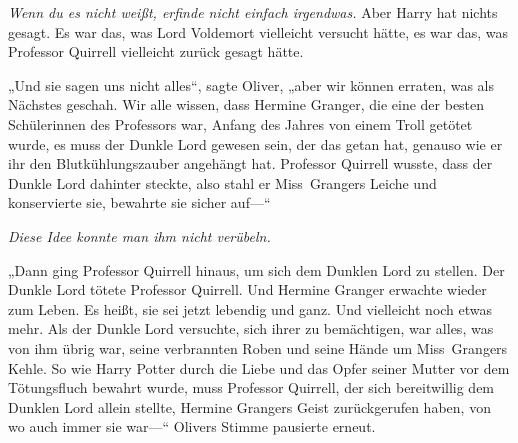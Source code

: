 \emph{Wenn du es nicht weißt, erfinde nicht einfach irgendwas.}
Aber Harry hat nichts gesagt. Es war das, was Lord Voldemort vielleicht versucht hätte, es war das, was Professor Quirrell vielleicht zurück gesagt hätte.

„Und sie sagen uns nicht alles“, sagte Oliver, „aber wir können erraten, was als Nächstes geschah. Wir alle wissen, dass Hermine Granger, die eine der besten Schülerinnen des Professors war, Anfang des Jahres von einem Troll getötet wurde, es muss der Dunkle Lord gewesen sein, der das getan hat, genauso wie er ihr den Blutkühlungszauber angehängt hat. Professor Quirrell wusste, dass der Dunkle Lord dahinter steckte, also stahl er Miss~Grangers Leiche und konservierte sie, bewahrte sie sicher auf—“

\emph{Diese Idee konnte man ihm nicht verübeln.}

„Dann ging Professor Quirrell hinaus, um sich dem Dunklen Lord zu stellen. Der Dunkle Lord tötete Professor Quirrell. Und Hermine Granger erwachte wieder zum Leben. Es heißt, sie sei jetzt lebendig und ganz. Und vielleicht noch etwas mehr.
Als der Dunkle Lord versuchte, sich ihrer zu bemächtigen, war alles, was von ihm übrig war, seine verbrannten Roben und seine Hände um Miss~Grangers Kehle.
So wie Harry Potter durch die Liebe und das Opfer seiner Mutter vor dem Tötungsfluch bewahrt wurde, muss Professor Quirrell, der sich bereitwillig dem Dunklen Lord allein stellte, Hermine Grangers Geist zurückgerufen haben, von wo auch immer sie war—“
Olivers Stimme pausierte erneut.

